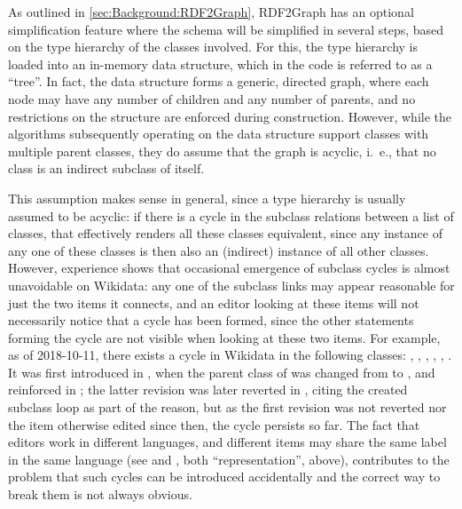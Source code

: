 As outlined in \cref{sec:Background:RDF2Graph},
\gls{RDF2Graph} has an optional simplification feature
where the \gls{schema} will be simplified in several steps,
based on the type hierarchy of the classes involved.
For this, the type hierarchy is loaded into an in-memory data structure,
which in the code is referred to as a “tree”.
In fact, the data structure forms a generic, directed graph,
where each node may have any number of children and any number of parents,
and no restrictions on the structure are enforced during construction.
However, while the algorithms subsequently operating on the data structure support classes with multiple parent classes,
they do assume that the graph is acyclic,
i.~e., that no class is an indirect subclass of itself.

This assumption makes sense in general,
since a type hierarchy is usually assumed to be acyclic:
if there is a cycle in the subclass relations between a list of classes,
that effectively renders all these classes equivalent,
since any instance of any one of these classes is then also an (indirect) instance of all other classes.
However, experience shows %
that occasional emergence of subclass cycles is almost unavoidable on \gls{Wikidata}:
any one of the subclass links may appear reasonable for just the two \glspl{item} it connects,
and an editor looking at these \glspl{item} will not necessarily notice that a cycle has been formed,
since the other statements forming the cycle are not visible when looking at these two \glspl{item}.
For example, as of 2018-10-11, %
there exists a cycle in \gls{Wikidata} in the following classes:
, , ,
, , .
It was first introduced in ,
when the parent class of 
was changed from  to ,
and reinforced in ;
the latter revision was later reverted in ,
citing the created subclass loop as part of the reason,
but as the first revision was not reverted nor the \gls{item} otherwise edited since then,
the cycle persists so far.
The fact that editors work in different languages,
and different items may share the same label in the same language
(see  and , both “representation”, above),
contributes to the problem that such cycles can be introduced accidentally
and the correct way to break them is not always obvious.

